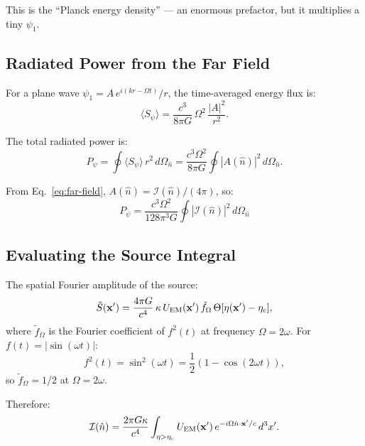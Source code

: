 \documentclass[11pt]{article}
\newcommand{\etac}{\eta_c}
\begin{document}
This is the ``Planck energy density'' --- an enormous prefactor, but it
multiplies a tiny $\psi_1$.

\subsection{Radiated Power from the Far Field}

For a plane wave $\psi_1 = A\,e^{i(kr - \Omega t)}/r$, the time-averaged
energy flux is:
\begin{equation}
\langle S_\psi \rangle = \frac{c^3}{8\pi G}\,\Omega^2\,\frac{|A|^2}{r^2}.
\end{equation}

The total radiated power is:
\begin{equation}
P_\psi = \oint \langle S_\psi \rangle\,r^2\,d\Omega_{\hat{n}}
  = \frac{c^3\Omega^2}{8\pi G} \oint |A(\hat{n})|^2\,d\Omega_{\hat{n}}.
\end{equation}

From Eq.~\eqref{eq:far-field}, $A(\hat{n}) = \mathcal{I}(\hat{n})/(4\pi)$, so:
\begin{equation}\label{eq:total-power}
\boxed{P_\psi = \frac{c^3\Omega^2}{128\pi^3 G}
  \oint |\mathcal{I}(\hat{n})|^2\,d\Omega_{\hat{n}}}
\end{equation}

\subsection{Evaluating the Source Integral}

The spatial Fourier amplitude of the source:
\begin{equation}
\tilde{S}(\mathbf{x}') = \frac{4\pi G}{c^4}\,\kappa\,
  U_{\rm EM}(\mathbf{x}')\,\tilde{f}_\Omega\,
  \Theta[\eta(\mathbf{x}') - \etac],
\end{equation}
where $\tilde{f}_\Omega$ is the Fourier coefficient of $f^2(t)$ at
frequency $\Omega = 2\omega$. For $f(t) = |\sin(\omega t)|$:
\begin{equation}
f^2(t) = \sin^2(\omega t) = \frac{1}{2}(1 - \cos(2\omega t)),
\end{equation}
so $\tilde{f}_\Omega = 1/2$ at $\Omega = 2\omega$.

Therefore:
\begin{equation}
\mathcal{I}(\hat{n}) = \frac{2\pi G\kappa}{c^4} \int_{\eta > \etac}
  U_{\rm EM}(\mathbf{x}')\,e^{-i\Omega\hat{n}\cdot\mathbf{x}'/c}\,d^3x'.
\end{equation}
\end{document}
